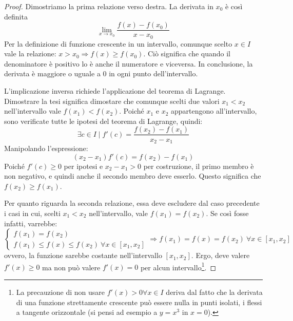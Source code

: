 \begin{proof}
	Dimostriamo la prima relazione verso destra. La derivata in $x_0$ è così definita
	\[
		\lim_{x\to x_0}\frac{f(x)-f(x_0)}{x-x_0}
	\]
	Per la definizione di funzione crescente in un intervallo, comunque scelto $x\in I$ vale la relazione: $x>x_0\Rightarrow f(x)\geq f(x_0)$. Ciò significa che quando il denominatore è positivo lo è anche il numeratore e viceversa. In conclusione, la derivata è maggiore o uguale a $0$ in ogni punto dell'intervallo.

	L'implicazione inversa richiede l'applicazione del teorema di Lagrange. Dimostrare la tesi significa dimostare che comunque scelti due valori $x_1<x_2$ nell'intervallo vale $f(x_1)<f(x_2)$. Poiché $x_1$ e $x_2$ appartengono all'intervallo, sono verificate tutte le ipotesi del teorema di Lagrange, quindi:
	\[
		\exists c\in I\mid f'(c)=\frac{f(x_2)-f(x_1)}{x_2-x_1}
	\]
	Manipolando l'espressione:
	\[
		(x_2-x_1)f'(c)=f(x_2)-f(x_1)
	\]
	Poiché $f'(c)\geq0$ per ipotesi e $x_2-x_1>0$ per costruzione, il primo membro è non negativo, e quindi anche il secondo membro deve esserlo. Questo significa che $f(x_2)\geq f(x_1)$.

	Per quanto riguarda la seconda relazione, essa deve escludere dal caso precedente i casi in cui, scelti $x_1<x_2$ nell'intervallo, vale $f(x_1)=f(x_2)$. Se così fosse infatti, varrebbe:
	\[
		\begin{cases}
			f(x_1)=f(x_2) \\
			f(x_1)\leq f(x)\leq f(x_2)~\forall x\in [x_1,x_2]
		\end{cases}\Rightarrow f(x_1)=f(x)=f(x_2)~\forall x\in [x_1,x_2]
	\]
	ovvero, la funzione sarebbe costante nell'intervallo $[x_1,x_2]$. Ergo, deve valere $f'(x)\geq0$ ma non può valere $f'(x)=0$ per alcun intervallo\footnote{La precauzione di non usare $f'(x)>0\forall x\in I$ deriva dal fatto che la derivata di una funzione strettamente crescente può essere nulla in punti isolati, i flessi a tangente orizzontale (si pensi ad esempio a $y=x^3$ in $x=0$).}.
\end{proof}

